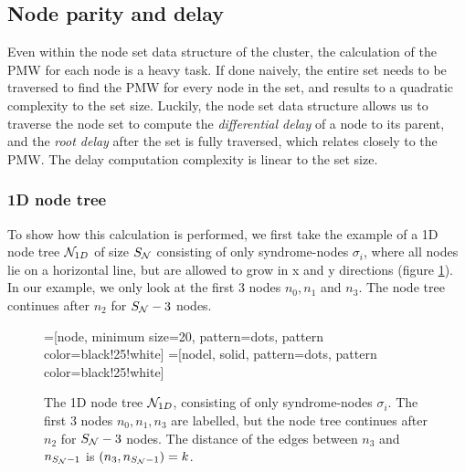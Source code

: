 \subsection{Node parity and delay}\label{sec:nodedelay}

Even within the node set data structure of the cluster, the calculation of the PMW for each node is a heavy task. If done naively, the entire set needs to be traversed to find the PMW for every node in the set, and results to a quadratic complexity to the set size. Luckily, the node set data structure allows us to traverse the node set to compute the \emph{differential delay} of a node to its parent, and the \emph{root delay} after the set is fully traversed, which relates closely to the PMW. The delay computation complexity is linear to the set size.

\subsubsection{1D node tree}
To show how this calculation is performed, we first take the example of a 1D node tree $\mathcal{N}_{1D}$ of size $S_{\mathcal{N}}$ consisting of only syndrome-nodes $\sigma_i$, where all nodes lie on a horizontal line, but are allowed to grow in x and y directions (figure \ref{fig:1dnodetree}). In our example, we only look at the first 3 nodes $n_0, n_1$ and $n_3$. The node tree continues after $n_2$ for $S_{\mathcal{N}} - 3$ nodes.

\begin{figure}[h]
  \centering
  =[node, minimum size=20, pattern=dots, pattern color=black!25!white]
  =[nodel, solid, pattern=dots, pattern color=black!25!white]
  \caption{The 1D node tree $\mathcal{N}_{1D}$, consisting of only syndrome-nodes $\sigma_i$. The first 3 nodes $n_0, n_1, n_3$ are labelled, but the node tree continues after $n_2$ for $S_{\mathcal{N}} - 3$ nodes. The distance of the edges between $n_3$ and $n_{S_{\mathcal{N}}-1}$ is $(n_3, n_{S_{\mathcal{N}}-1})=k$.}\label{fig:1dnodetree}
\end{figure}

